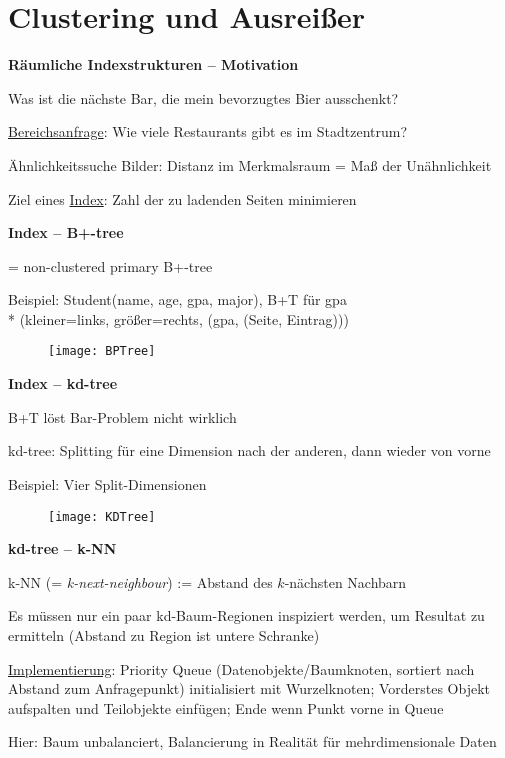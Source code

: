 \section{Clustering und Ausreißer}
\label{sec:clustering}

\textbf{Räumliche Indexstrukturen -- Motivation}
\begin{items}
	\item Was ist die nächste Bar, die mein bevorzugtes Bier ausschenkt?
	\item \underline{Bereichsanfrage}: Wie viele Restaurants gibt es im Stadtzentrum?
	\item Ähnlichkeitssuche Bilder: Distanz im Merkmalsraum = Maß der Unähnlichkeit
	\item Ziel eines \underline{Index}: Zahl der zu ladenden Seiten minimieren
\end{items}

\textbf{Index -- B+-tree}
\begin{items}
	\item = non-clustered primary B+-tree
	\item Beispiel: Student(name, age, gpa, major), B+T für gpa \\* (kleiner=links, größer=rechts, (gpa, (Seite, Eintrag)))
	\begin{figure}[H]\centering\label{BPTree}\texttt{[image: BPTree]}\end{figure}
\end{items}

\newpage

\textbf{Index -- kd-tree}
\begin{items}
	\item B+T löst Bar-Problem nicht wirklich
	\item kd-tree: Splitting für eine Dimension nach der anderen, dann wieder von vorne
	\item Beispiel: Vier Split-Dimensionen
\end{items}
\begin{figure}[H]\centering\label{KDTree}\texttt{[image: KDTree]}\end{figure}

\textbf{kd-tree -- k-NN}
\begin{items}
	\item k-NN (= \emph{k-next-neighbour}) := Abstand des \( k \)-nächsten Nachbarn
	\item Es müssen nur ein paar kd-Baum-Regionen inspiziert werden, um Resultat zu ermitteln (Abstand zu Region ist untere Schranke)
	\item \underline{Implementierung}: Priority Queue (Datenobjekte/Baumknoten, sortiert nach Abstand zum Anfragepunkt) initialisiert mit Wurzelknoten; Vorderstes Objekt aufspalten und Teilobjekte einfügen; Ende wenn Punkt vorne in Queue
	\item Hier: Baum unbalanciert, Balancierung in Realität für mehrdimensionale Daten
\end{items}

